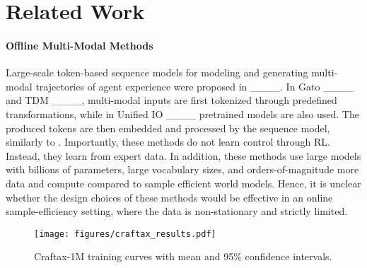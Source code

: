 \section{Related Work}
\paragraph{Offline Multi-Modal Methods}
Large-scale token-based sequence models for modeling and generating multi-modal trajectories of agent experience were proposed in ____.
In Gato ____ and TDM ____, multi-modal inputs are first tokenized through predefined transformations, while in Unified IO ____ pretrained models are also used.
The produced tokens are then embedded and processed by the sequence model, similarly to \AlgName{}.
Importantly, these methods do not learn control through RL.
Instead, they learn from expert data.
In addition, these methods use large models with billions of parameters, large vocabulary sizes, and orders-of-magnitude more data and compute compared to sample efficient world models.
Hence, it is unclear whether the design choices of these methods would be effective in an online sample-efficiency setting, where the data is non-stationary and strictly limited.



\begin{figure}[t]
    \centering
    \texttt{[image: figures/craftax\_results.pdf]}
    \caption{Craftax-1M training curves with mean and 95\% confidence intervals. }
    \label{fig:craftax-main-results}
\end{figure}






